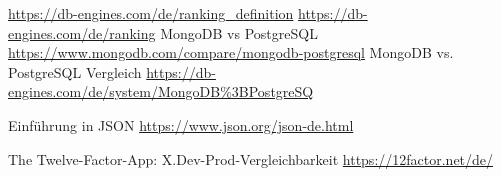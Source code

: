 \begin{thebibliography}{HR08}
   \url{https://db-engines.com/de/ranking_definition}
   \url{https://db-engines.com/de/ranking}
   MongoDB vs PostgreSQL \url{https://www.mongodb.com/compare/mongodb-postgresql}
   MongoDB vs. PostgreSQL Vergleich \url{https://db-engines.com/de/system/MongoDB%3BPostgreSQ}

   Einführung in JSON \url{https://www.json.org/json-de.html}

  The Twelve-Factor-App: X.Dev-Prod-Vergleichbarkeit \url{https://12factor.net/de/}







\end{thebibliography}